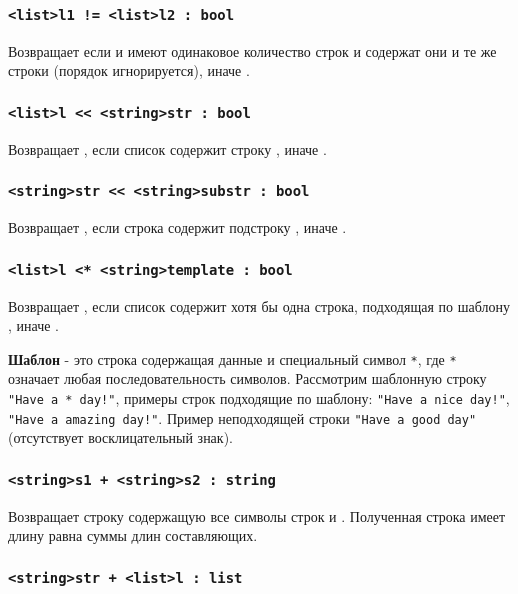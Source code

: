 \documentclass[a4paper, 14pt]{extarticle}
\begin{document}
\subsubsection{\lstinline`<list>l1 != <list>l2 : bool`}

Возвращает \false{} если  и  имеют одинаковое количество строк и содержат они и те же строки (порядок игнорируется), иначе \true{}.

\subsubsection{\lstinline`<list>l << <string>str : bool`}

Возвращает \true{}, если список  содержит строку , иначе \false{}.

\subsubsection{\lstinline`<string>str << <string>substr : bool`}

Возвращает \true{}, если строка  содержит подстроку , иначе \false{}.

\subsubsection{\lstinline`<list>l <* <string>template : bool`}

Возвращает \true{}, если список  содержит хотя бы одна строка, подходящая по шаблону , иначе \false{}.

{\bf Шаблон} - это строка содержащая данные и специальный символ \lstinline`*`, где \lstinline`*` означает любая последовательность символов. Рассмотрим шаблонную строку \lstinline`"Have a * day!"`, примеры строк подходящие по шаблону: \lstinline`"Have a nice day!"`, \lstinline`"Have a amazing day!"`. Пример неподходящей строки \lstinline`"Have a good day"` (отсутствует восклицательный знак).

\subsubsection{\lstinline`<string>s1 + <string>s2 : string`}

Возвращает строку содержащую все символы строк  и . Полученная строка имеет длину равна суммы длин составляющих.

\subsubsection{\lstinline`<string>str + <list>l : list`}
\end{document}
